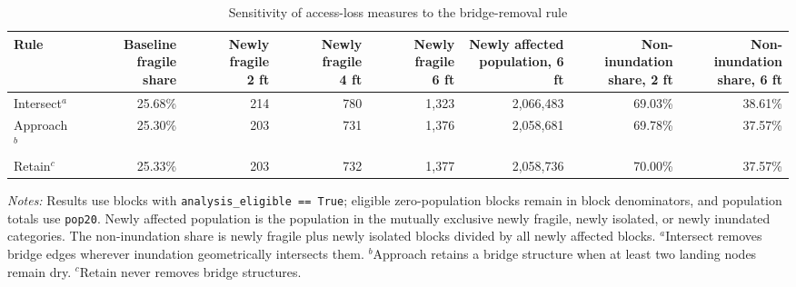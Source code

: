 \begin{table}[htbp]
\centering
\caption{Sensitivity of access-loss measures to the bridge-removal rule}
\label{tab:bridge-rule-sensitivity}
\small
\setlength{\tabcolsep}{3.5pt}
\begin{tabular}{lrrrrrrr}
\hline
Rule & \shortstack{Baseline fragile\\share} & \shortstack{Newly fragile\\2 ft} & \shortstack{Newly fragile\\4 ft} & \shortstack{Newly fragile\\6 ft} & \shortstack{Newly affected\\population, 6 ft} & \shortstack{Non-inundation\\share, 2 ft} & \shortstack{Non-inundation\\share, 6 ft} \\
\hline
Intersect$^{a}$ & 25.68\% & 214 & 780 & 1,323 & 2,066,483 & 69.03\% & 38.61\% \\
Approach$^{b}$  & 25.30\% & 203 & 731 & 1,376 & 2,058,681 & 69.78\% & 37.57\% \\
Retain$^{c}$    & 25.33\% & 203 & 732 & 1,377 & 2,058,736 & 70.00\% & 37.57\% \\
\hline
\end{tabular}

\begin{minipage}{0.99\linewidth}
\footnotesize
\textit{Notes:} Results use blocks with \texttt{analysis\_eligible == True}; eligible zero-population blocks remain in block denominators, and population totals use \texttt{pop20}. Newly affected population is the population in the mutually exclusive newly fragile, newly isolated, or newly inundated categories. The non-inundation share is newly fragile plus newly isolated blocks divided by all newly affected blocks. $^{a}$Intersect removes bridge edges wherever inundation geometrically intersects them. $^{b}$Approach retains a bridge structure when at least two landing nodes remain dry. $^{c}$Retain never removes bridge structures.
\end{minipage}
\end{table}
